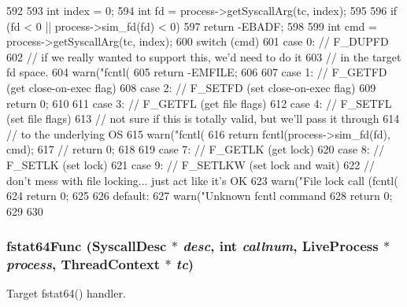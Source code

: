 \begin{DoxyCode}
592 {
593     int index = 0;
594     int fd = process->getSyscallArg(tc, index);
595 
596     if (fd < 0 || process->sim_fd(fd) < 0)
597         return -EBADF;
598 
599     int cmd = process->getSyscallArg(tc, index);
600     switch (cmd) {
601       case 0: // F_DUPFD
602         // if we really wanted to support this, we'd need to do it
603         // in the target fd space.
604         warn("fcntl(%
605         return -EMFILE;
606 
607       case 1: // F_GETFD (get close-on-exec flag)
608       case 2: // F_SETFD (set close-on-exec flag)
609         return 0;
610 
611       case 3: // F_GETFL (get file flags)
612       case 4: // F_SETFL (set file flags)
613         // not sure if this is totally valid, but we'll pass it through
614         // to the underlying OS
615         warn("fcntl(%
616         return fcntl(process->sim_fd(fd), cmd);
617         // return 0;
618 
619       case 7: // F_GETLK  (get lock)
620       case 8: // F_SETLK  (set lock)
621       case 9: // F_SETLKW (set lock and wait)
622         // don't mess with file locking... just act like it's OK
623         warn("File lock call (fcntl(%
624         return 0;
625 
626       default:
627         warn("Unknown fcntl command %
628         return 0;
629     }
630 }
\end{DoxyCode}
\hypertarget{syscall__emul_8hh_ac9c78c04e130987fc30d9e84fc2a8be3}{
\subsubsection[{fstat64Func}]{ fstat64Func ({\bf SyscallDesc} $\ast$ {\em desc}, \/  int {\em callnum}, \/  {\bf LiveProcess} $\ast$ {\em process}, \/  {\bf ThreadContext} $\ast$ {\em tc})}}
\label{syscall__emul_8hh_ac9c78c04e130987fc30d9e84fc2a8be3}


Target fstat64() handler. 



